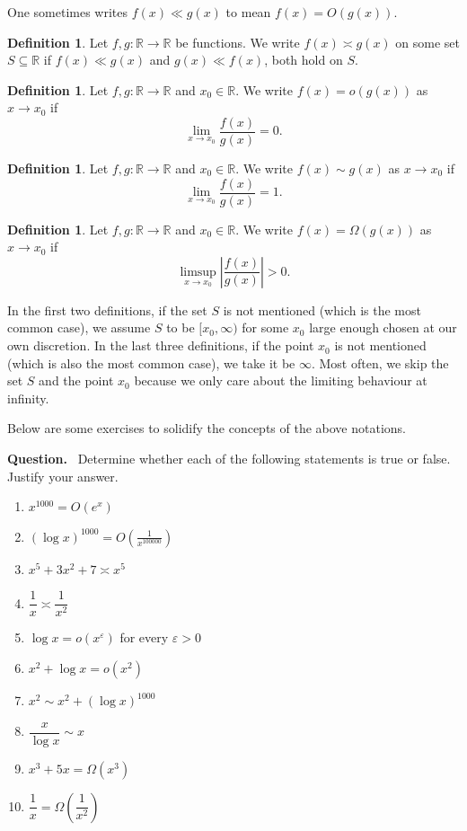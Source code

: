 \documentclass[10pt,openany]{book}
\theoremstyle{italicnonumber}
\theoremstyle{definition}
\newtheorem{definition}[theorem]{Definition}
\newenvironment{question}{\par\vspace{1ex}\noindent\textbf{Question.}\ }{\par}
\newcommand{\R}{\mathbb{R}}
\newcommand{\su}{\subseteq}
\begin{document}
One sometimes writes $f(x) \ll g(x)$ to mean $f(x) = O(g(x))$.

\begin{definition}
Let $f, g : \mathbb{R} \to \mathbb{R}$ be functions. We write $f(x) \asymp g(x)$ on some set $S \su \R$ if $f(x) \ll g(x)$ and $g(x) \ll f(x)$, both hold on $S$.
\end{definition}

\begin{definition}
Let $f, g : \mathbb{R} \to \mathbb{R}$ and $x_0 \in \mathbb{R}$. We write $f(x) = o(g(x))$ as $x \to x_0$ if
\[
\lim_{x \to x_0} \frac{f(x)}{g(x)} = 0.
\]
\end{definition}

\begin{definition}
Let $f, g : \mathbb{R} \to \mathbb{R}$ and $x_0 \in \mathbb{R}$. We write $f(x) \sim g(x)$ as $x \to x_0$ if
\[
\lim_{x \to x_0} \frac{f(x)}{g(x)} = 1.
\]
\end{definition}

\begin{definition}
Let $f, g : \mathbb{R} \to \mathbb{R}$ and $x_0 \in \mathbb{R}$. We write $f(x) = \Omega(g(x))$ as $x \to x_0$ if
\[
\limsup_{x \to x_0} \left|\frac{f(x)}{g(x)}\right| > 0.
\]
\end{definition}

In the first two definitions, if the set $S$ is not mentioned (which is the most common case), we assume $S$ to be $[x_0,\infty)$ for some $x_0$ large enough chosen at our own discretion. In the last three definitions, if the point $x_0$ is not mentioned (which is also the most common case), we take it be $\infty$. Most often, we skip the set $S$ and the point $x_0$ because we only care about the limiting behaviour at infinity.

Below are some exercises to solidify the concepts of the above notations.

\begin{question}
Determine whether each of the following statements is true or false. Justify your answer.
\begin{enumerate}[label=(\roman*)]
    \item $x^{1000} = O(e^x)$
    \item $(\log x)^{1000} = O\left(\frac{1}{x^{100000}}\right)$
    \item $x^5 + 3x^2 + 7 \asymp x^5$
    \item $\dfrac{1}{x} \asymp \dfrac{1}{x^2}$
    \item $\log x = o(x^\varepsilon)$ for every $\varepsilon > 0$
    \item $x^2 + \log x = o(x^2)$
    \item $x^2 \sim x^2 + (\log x)^{1000}$
    \item $\dfrac{x}{\log x} \sim x$
     \item $x^3 + 5x = \Omega(x^3)$
    \item $\dfrac{1}{x} = \Omega\left(\dfrac{1}{x^2}\right)$
\end{enumerate}
\end{question}
\end{document}
